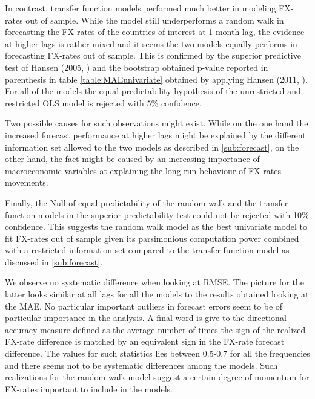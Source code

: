 In contrast, transfer function models performed much better in modeling FX-rates out of sample. While the model still underperforms a random walk in
forecasting the FX-rates of the countries of interest at 1 month lag, the evidence at higher lags is rather mixed and it seems the two models equally
performs in forecasting FX-rates out of sample. This is confirmed by the superior predictive test of Hansen (2005, \cite{HansenSPA}) and the
bootstrap obtained p-value reported in parenthesis in table \ref{table:MAEunivariate} obtained by applying Hansen (2011, \cite{HansenMCS}).
For all of the models the equal predictability hypothesis of the unrestricted and restricted OLS model is rejected with 5\% confidence.

Two possible causes for such observations might exist. While on the one hand the increased
forecast performance at higher lags might be explained by the different information set allowed to the two models as described in \ref{sub:forecast},
on the other hand, the fact might be caused by an increasing importance of macroeconomic variables at explaining the long run behaviour
of FX-rates movements.

Finally, the Null of equal predictability of the random walk and the transfer function models in the superior predictability test could not be rejected
with 10\% confidence. This suggests the random walk model as the best univariate model to fit FX-rates out of sample given its parsimonious computation
power combined with a restricted information set compared to the transfer function model as discussed in \ref{sub:forecast}.

We observe no systematic difference when looking at RMSE. The picture for the latter looks similar at all lags for all the models
to the results obtained looking at the MAE. No particular important outliers in forecast errors seem to be of particular importance in the analysis.
A final word is give to the directional accuracy measure defined as the average number of times the sign of the realized FX-rate difference is matched by
an equivalent sign in the FX-rate forecast difference. The values for such statistics lies  between 0.5-0.7
for all the frequencies and there seems not to be systematic differences among the models. Such realizations for the
random walk model suggest a certain degree of momentum for FX-rates important to include in the models.

